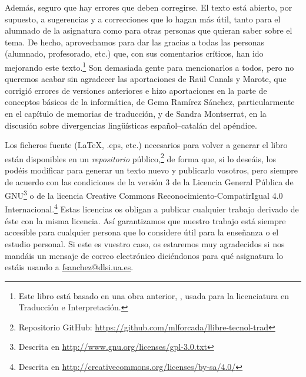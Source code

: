 Además, seguro que hay errores que deben corregirse. El texto está abierto, por supuesto, a sugerencias y a correcciones que lo hagan más útil, tanto para el alumnado de la asignatura como para otras personas que quieran saber sobre el tema. De hecho, aprovechamos para dar las gracias a todas las personas (alumnado, profesorado, etc.) que, con sus comentarios críticos, han ido mejorando este texto.\footnote{Este libro está basado en una obra anterior, \protect\citep{forcada09b}, usada para la licenciatura en Traducción e Interpretación.} Son demasiada gente para mencionarlos a todos, pero no queremos acabar sin agradecer las aportaciones de Raül Canals y Marote, que corrigió errores de versiones anteriores e hizo aportaciones en la parte de conceptos básicos de la informática, de Gema Ramírez Sánchez, particularmente en el capítulo de memorias de traducción, y de Sandra Montserrat, en la discusión sobre divergencias lingüísticas español--catalán del apéndice. 

Los ficheros fuente (\LaTeX, .eps, etc.) necesarios para volver a
generar el libro están disponibles en un \emph{repositorio}
público,\footnote{Repositorio GitHub:
  \url{https://github.com/mlforcada/llibre-tecnol-trad}} de forma que,
si lo deseáis, los podéis modificar para generar un texto nuevo y
publicarlo vosotros, pero siempre de acuerdo con las condiciones de la
versión 3 de la Licencia General Pública de GNU\footnote{Descrita en
  \url{http://www.gnu.org/licenses/gpl-3.0.txt}} o de la licencia
Creative Commons Reconocimiento-CompatirIgual 4.0
Internacional.\footnote{Descrita en
  \url{http://creativecommons.org/licenses/by-sa/4.0/}} Estas
licencias os obligan a publicar cualquier trabajo derivado de éste con
la misma licencia. Así garantizamos que nuestro trabajo está siempre
accesible para cualquier persona que lo considere útil para la
enseñanza o el estudio personal. Si este es vuestro caso, os estaremos
muy agradecidos si nos mandáis un mensaje de correo electrónico
diciéndonos para qué asignatura lo estáis usando a
\url{fsanchez@dlsi.ua.es}. 


